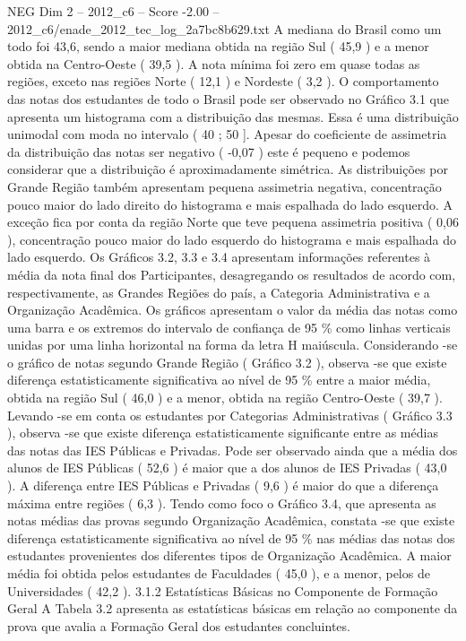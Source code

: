 \begin{textsample}{NEG Dim 2 – 2012\_c6 – Score -2.00 – 2012\_c6/enade\_2012\_tec\_log\_2a7bc8b629.txt}
A mediana do Brasil como um todo foi 43,6, sendo a maior mediana obtida na região Sul ( 45,9 ) e a menor obtida na Centro-Oeste ( 39,5 ).
A nota mínima foi zero em quase todas as regiões, exceto nas regiões Norte ( 12,1 ) e Nordeste ( 3,2 ).
O comportamento das notas dos estudantes de todo o Brasil pode ser observado no Gráfico 3.1 que apresenta um histograma com a distribuição das mesmas.
Essa é uma distribuição unimodal com moda no intervalo ( 40 ; 50 ].
Apesar do coeficiente de assimetria da distribuição das notas ser negativo ( -0,07 ) este é pequeno e podemos considerar que a distribuição é aproximadamente simétrica.
As distribuições por Grande Região também apresentam pequena assimetria negativa, concentração pouco maior do lado direito do histograma e mais espalhada do lado esquerdo.
A exceção fica por conta da região Norte que teve pequena assimetria positiva ( 0,06 ), concentração pouco maior do lado esquerdo do histograma e mais espalhada do lado esquerdo.
Os Gráficos 3.2, 3.3 e 3.4 apresentam informações referentes à média da nota final dos Participantes, desagregando os resultados de acordo com, respectivamente, as Grandes Regiões do país, a Categoria Administrativa e a Organização Acadêmica.
Os gráficos apresentam o valor da média das notas como uma barra e os extremos do intervalo de confiança de 95 \% como linhas verticais unidas por uma linha horizontal na forma da letra H maiúscula.
Considerando -se o gráfico de notas segundo Grande Região ( Gráfico 3.2 ), observa -se que existe diferença estatisticamente significativa ao nível de 95 \% entre a maior média, obtida na região Sul ( 46,0 ) e a menor, obtida na região Centro-Oeste ( 39,7 ).
Levando -se em conta os estudantes por Categorias Administrativas ( Gráfico 3.3 ), observa -se que existe diferença estatisticamente significante entre as médias das notas das IES Públicas e Privadas.
Pode ser observado ainda que a média dos alunos de IES Públicas ( 52,6 ) é maior que a dos alunos de IES Privadas ( 43,0 ).
A diferença entre IES Públicas e Privadas ( 9,6 ) é maior do que a diferença máxima entre regiões ( 6,3 ).
Tendo como foco o Gráfico 3.4, que apresenta as notas médias das provas segundo Organização Acadêmica, constata -se que existe diferença estatisticamente significativa ao nível de 95 \% nas médias das notas dos estudantes provenientes dos diferentes tipos de Organização Acadêmica.
A maior média foi obtida pelos estudantes de Faculdades ( 45,0 ), e a menor, pelos de Universidades ( 42,2 ). 3.1.2 Estatísticas Básicas no Componente de Formação Geral A Tabela 3.2 apresenta as estatísticas básicas em relação ao componente da prova que avalia a Formação Geral dos estudantes concluintes.

\end{textsample}
